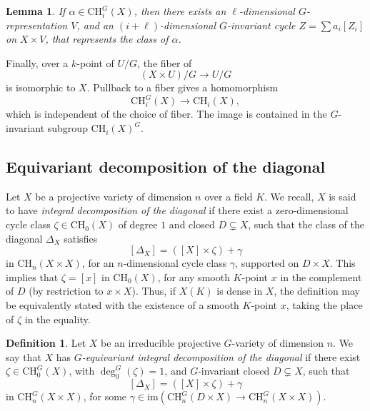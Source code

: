 \documentclass[12pt, reqno]{amsart}
\numberwithin{equation}{section}
\theoremstyle{plain}
\newtheorem{lemm}[prop]{Lemma}
\theoremstyle{definition}
\newtheorem{defi}[prop]{Definition}
\def\bC{{\mathbb C}}
\def\CH{\mathrm{CH}}
\begin{document}
\begin{lemm}\cite[Proposition 1]{EG98}
\label{lemma:G-invariantrepresentability}
If $\alpha \in \CH^G_i(X)$, then there exists an $\ell$-dimensional $G$-representation $V$, and an $(i+\ell)$-dimensional $G$-invariant cycle $Z=\sum a_i[Z_i]$ on $X \times V$, that represents the class of $\alpha$.
\end{lemm}

Finally, over a $k$-point of $U/G$, the fiber of 
\[
(X\times U)/G \to U/G
\]
is isomorphic to $X$.
Pullback to a fiber gives a homomorphism
\[
\CH_i^G(X) \to \CH_i(X),
\]
which is independent of the choice of fiber.
The image is contained in the $G$-invariant subgroup $\CH_i(X)^G$.

\subsection*{Equivariant decomposition of the diagonal}




Let $X$ be a projective variety of dimension $n$ over a field $K$.
We recall,
$X$ is said to have
\emph{integral decomposition of the diagonal} if there exist a zero-dimensional cycle class $\zeta\in \mathrm{CH}_0(X)$ of degree $1$ and closed $D\subsetneq X$, such that the class of the diagonal $\Delta_X$ satisfies
\[
[\Delta_X]=([X]\times \zeta)+\gamma
\]
in $\mathrm{CH}_n(X\times X)$, for an
$n$-dimensional cycle class $\gamma$,
supported on $D\times X$.
This implies that
$\zeta=[x]$ in $\mathrm{CH}_0(X)$, for any smooth $K$-point $x$ in the complement of $D$ (by
restriction to $x\times X$).
Thus, if $X(K)$ is dense in $X$, the definition may be equivalently stated with the existence of a smooth $K$-point $x$, taking the place of $\zeta$ in the equality.


\begin{defi}
\label{defn:diag}
Let $X$ be an irreducible projective $G$-variety of dimension $n$.
We say that $X$ has
\emph{$G$-equivariant integral decomposition of the diagonal}
if there exist $\zeta\in \mathrm{CH}_0^G(X)$, with $\deg^G_0(\zeta)=1$, and
$G$-invariant closed $D\subsetneq X$,
such that
\begin{equation}
\label{eqn:diag}
[\Delta_X]=([X]\times \zeta)+\gamma
\end{equation}
in $\mathrm{CH}_n^G(X \times X)$,
for some $\gamma\in \mathrm{im}(
\mathrm{CH}^G_n(D\times X)\to \mathrm{CH}^G_n(X\times X))$.
\end{defi}
\end{document}
